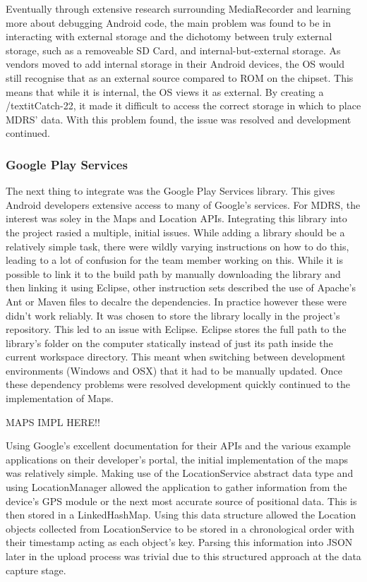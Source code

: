 \documentclass{l3proj}
\begin{document}
Eventually through extensive research surrounding MediaRecorder and learning more about debugging Android code, the main problem was found to be in interacting with external storage and the dichotomy between truly external storage, such as a removeable SD Card, and internal-but-external storage. As vendors moved to add internal storage in their Android devices, the OS would still recognise that as an external source compared to ROM on the chipset. This means that while it is internal, the OS views it as external. By creating a /textit{Catch-22}, it made it difficult to access the correct storage in which to place MDRS' data. With this problem found, the issue was resolved and development continued.

\subsubsection{Google Play Services}    The next thing to integrate was the Google Play Services library. This gives Android developers extensive access to many of Google's services. For MDRS, the interest was soley in the Maps and Location APIs. Integrating this library into the project rasied a multiple, initial issues. While adding a library should be a relatively simple task, there were wildly varying instructions on how to do this, leading to a lot of confusion for the team member working on this. While it is possible to link it to the build path by manually downloading the library and then linking it using Eclipse, other instruction sets described the use of Apache's Ant or Maven files to decalre the dependencies. In practice however these were didn't work reliably. It was chosen to store the library locally in the project's repository. This led to an issue with Eclipse. Eclipse stores the full path to the library's folder on the computer statically instead of just its path inside the current workspace directory. This meant when switching between development environments (Windows and OSX) that it had to be manually updated. Once these  dependency problems were resolved development quickly continued to the implementation of Maps.

MAPS IMPL HERE!!

Using Google's excellent documentation for their APIs and the various example applications on their developer's portal, the initial implementation of the maps was relatively simple. Making use of the LocationService abstract data type and using LocationManager allowed the application to gather information from the device's GPS module or the next most accurate source of positional data. This is then stored in a LinkedHashMap. Using this data structure allowed the Location objects collected from LocationService to be stored in a chronological order with their timestamp acting as each object's key. Parsing this information into JSON later in the upload process was trivial due to this structured approach at the data capture stage.
\end{document}
